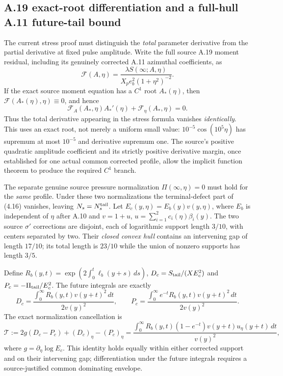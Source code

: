 \subsection*{A.19 exact-root differentiation and a full-hull A.11 future-tail bound}
\label{subsec:A11-root-whole-hull-bridge-20261021}
The current stress proof must distinguish the \emph{total} parameter
derivative from the partial derivative at fixed pulse amplitude.
Write the full source A.19 moment residual, including its genuinely
corrected A.11 azimuthal coefficients, as
\[
 \mathcal F(A,\eta)=\frac{\lambda S(\infty;A,\eta)}
 {X_pe_b^2(1+\eta^2)^{-2}}.
\]
If the exact source moment equation has a $C^1$ root $A_*(\eta)$,
then $\mathcal F(A_*(\eta),\eta)\equiv0$, and hence
\[
 \mathcal F_A(A_*,\eta)A_*'(\eta)
 +\mathcal F_\eta(A_*,\eta)=0.
\]
Thus the total derivative appearing in the stress formula vanishes
\emph{identically}. This uses an exact root, not merely a uniform
small value: $10^{-5}\cos(10^5\eta)$ has supremum at most $10^{-5}$
and derivative supremum one. The source's positive quadratic
amplitude coefficient and its strictly positive derivative margin,
once established for one actual common corrected profile, allow
the implicit function theorem to produce the required $C^1$ branch.

The separate genuine source pressure normalization
$\Pi(\infty,\eta)=0$ must hold for the \emph{same} profile. Under
these two normalizations the terminal-defect part of (4.16)
vanishes, leaving $N_s=N_s^{\rm tail}$. Let
$E_c(y,\eta)=E_b(y)v(y,\eta)$, where $E_b$ is independent of $\eta$
after A.10 and $v=1+u$,
$u=\sum_{i=1}^2 c_i(\eta)\beta_i(y)$.
The two source $\sigma'$ corrections are disjoint, each of
logarithmic support length $3/10$, with centers separated by two.
Their \emph{closed convex hull} contains an intervening gap of
length $17/10$; its total length is $23/10$ while the union
of nonzero supports has length $3/5$.

Define $R_b(y,t)=\exp(2\int_0^t\ell_b(y+s)\,ds)$,
$D_c=S_{\rm tail}/(XE_c^2)$ and $P_c=-\Pi_{\rm tail}/E_c^2$.
The future integrals are exactly
\[
D_c=\frac{\int_0^\infty R_b(y,t)v(y+t)^2\,dt}{2v(y)^2},
\qquad
P_c=\frac{\int_0^\infty e^{-t}R_b(y,t)v(y+t)^2\,dt}
{2v(y)^2}.
\]
The exact normalization cancellation is
\[
 \mathcal T:=2g(D_c-P_c)+(D_c)_\eta-(P_c)_\eta
 =\frac{\int_0^\infty R_b(y,t)(1-e^{-t})
 v(y+t)u_\eta(y+t)\,dt}{v(y)^2},
\]
where $g=\partial_\eta\log E_c$. This identity holds equally
within either corrected support and on their intervening gap;
differentiation under the future integrals requires a
source-justified common dominating envelope.


